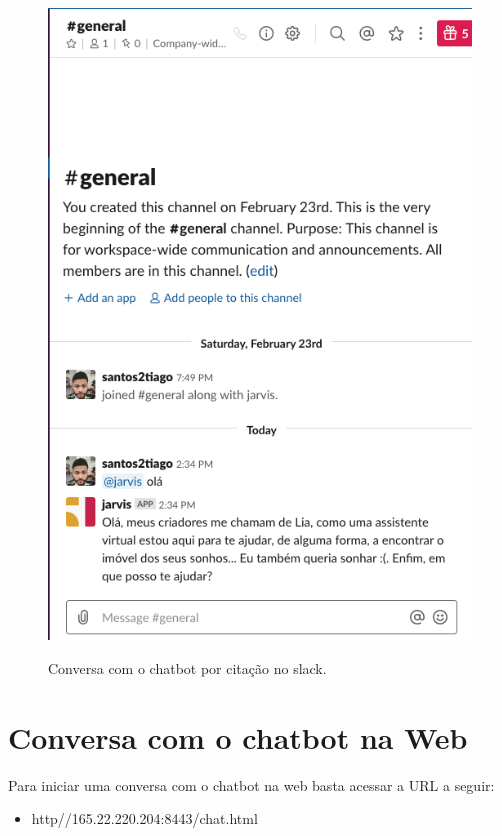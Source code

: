 \begin{figure}[H]
  \centering
   \caption{Conversa com o chatbot por citação no slack.}
  \includegraphics[scale=0.5]{Imagens/slack03.png} 
  \label{slack03}
\end{figure}

\section{Conversa com o chatbot na Web}

Para iniciar uma conversa com o chatbot na web basta acessar a URL a seguir:

\begin{itemize}
    \item http//165.22.220.204:8443/chat.html
\end{itemize}


